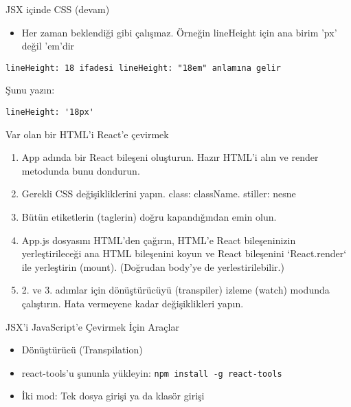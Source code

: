 \documentclass[presentation]{beamer}
\begin{document}
\begin{frame}[fragile,label=sec-13]{JSX içinde CSS (devam)}
 \begin{itemize}
\item Her zaman beklendiği gibi çalışmaz. Örneğin lineHeight için ana birim 'px'
değil 'em'dir
\end{itemize}
\begin{verbatim}
lineHeight: 18 ifadesi lineHeight: "18em" anlamına gelir
\end{verbatim}

Şunu yazın:
\begin{verbatim}
lineHeight: '18px'
\end{verbatim}
\end{frame}

\begin{frame}[label=sec-14]{Var olan bir HTML'i React'e çevirmek}
\begin{enumerate}
\item App adında bir React bileşeni oluşturun. Hazır HTML'i alın ve render
metodunda bunu dondurun.

\item Gerekli CSS değişikliklerini yapın. class: className. stiller: nesne

\item Bütün etiketlerin (taglerin) doğru kapandığından emin olun.

\item App.js dosyasını HTML'den çağırın, HTML'e React bileşeninizin
yerleştirileceği ana HTML bileşenini koyun ve React bileşenini `React.render`
ile yerleştirin (mount). (Doğrudan body'ye de yerlestirilebilir.)

\item 2. ve 3. adımlar için dönüştürücüyü (transpiler) izleme (watch) modunda
çalıştırın. Hata vermeyene kadar değişiklikleri yapın.
\end{enumerate}
\end{frame}

\begin{frame}[fragile,label=sec-15]{JSX'i JavaScript'e Çevirmek İçin Araçlar}
 \begin{itemize}
\item Dönüştürücü (Transpilation)
\item \alert{react-tools}'u şununla yükleyin: \texttt{npm install -g react-tools}
\item İki mod: Tek dosya girişi  ya da klasör girişi
\end{itemize}
\end{frame}
\end{document}
